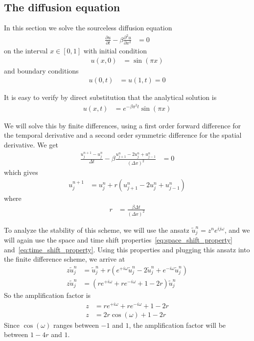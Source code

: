 \documentclass[twocolumn]{myarticle}
\begin{document}
\subsection{The diffusion equation}
\label{subsec:the_diffusion_equation}

In this section we solve the sourceless diffusion equation
\begin{align}
    \frac{\partial u}{\partial t} - \beta \frac{\partial^2 u}{\partial x^2} &= 0
\end{align}
on the interval $ x \in [0,1] $ with initial condition
\begin{align}
    u(x,0) &= \sin(\pi x)
\end{align}
and boundary conditions
\begin{align}
    u(0, t) &= u(1, t) = 0
\end{align}

It is easy to verify by direct substitution that the analytical solution is
\begin{align}
    u(x, t) &= e^{-\beta \pi^2 t} \sin(\pi x)
\end{align}

We will solve this by finite differences, using a first order forward difference for the temporal derivative and a second order symmetric difference for the spatial derivative.
We get
\begin{align}
    \frac{u^{n+1}_j - u^n_j}{\Delta t} - \beta \frac{u^{n}_{j+1} - 2 u^n_j + u^{n}_{j-1}}{(\Delta x)^2} &= 0
\end{align}
which gives
\begin{align}
    u^{n+1}_j &= u^n_j + r \left( u^{n}_{j+1} - 2 u^n_j + u^{n}_{j-1} \right)
\end{align}
where
\begin{align}
    r &= \frac{\beta \Delta t}{(\Delta x)^2}
\end{align}

To analyze the stability of this scheme, we will use the ansatz $ \tilde{u}^n_j = z^n e^{i j \omega} $, and we will again use the space and time shift properties~\eqref{eq:space_shift_property} and~\eqref{eq:time_shift_property}.
Using this properties and plugging this ansatz into the finite difference scheme, we arrive at
\begin{align}
    z \tilde{u}^n_j &= \tilde{u}^n_j + r \left( e^{+i \omega} \tilde{u}^n_j - 2 \tilde{u}^n_j + e^{-i\omega} \tilde{u}^n_j \right)
    \\
    z \tilde{u}^n_j &= \left( r e^{+i\omega} + r e^{-i\omega} + 1 - 2 r \right) \tilde{u}^n_j
\end{align}
So the amplification factor is
\begin{align}
    z &= r e^{+i\omega} + r e^{-i\omega} + 1 - 2 r
    \\
    z &= 2 r \cos(\omega) + 1 - 2 r
\end{align}
Since $ \cos(\omega) $ ranges between $ -1 $ and $ 1 $, the amplification factor will be between $ 1 - 4r $ and $ 1 $.
\end{document}
